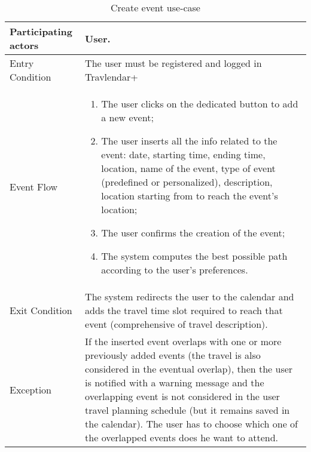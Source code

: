 \begin{table}[H]
	\begin{center}
		\begin{tabular}{ | p{} | p{} | }
		\hline
		Participating actors & User.\\
		\hline
		Entry Condition & The user must be registered and logged in Travlendar+\\
		\hline
		Event Flow & 
			\begin{enumerate}
				\item The user clicks on the dedicated button to add a new event;
				\item The user inserts all the info related to the event: date, starting time, ending time, location, name of the event, type of event (predefined or personalized), description, location starting from to reach the event's location;
				\item The user confirms the creation of the event;
				\item The system computes the best possible path according to the  user's preferences.
			\end{enumerate} \\
		\hline
		Exit Condition & The system redirects the user to the calendar and adds the travel time slot required to reach that event (comprehensive of travel description). \\
		\hline
		Exception & If the inserted event overlaps with one or more previously added events (the travel is also considered in the eventual overlap), then the user is notified with a warning message and the overlapping event is not considered in the user travel planning schedule (but it remains saved in the calendar). The user has to choose which one of the overlapped events does he want to attend.\\ 
		\hline
		\end{tabular}
	\end{center}
	\caption{Create event use-case}
\end{table}
